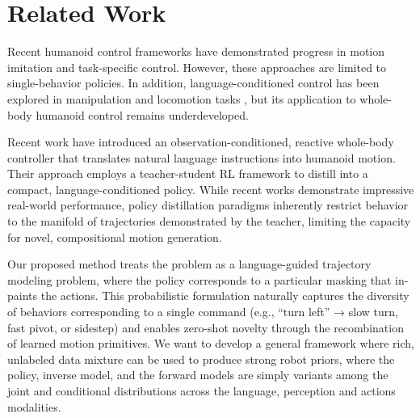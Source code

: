 \section{Related Work}
\label{sec:related-work}

Recent humanoid control frameworks \cite{liao2025beyondmimicmotiontrackingversatile} \cite{ji2024exbody2} have demonstrated progress in motion imitation and task-specific control. However, these approaches are limited to single-behavior policies. In addition, language-conditioned control has been explored in manipulation and locomotion tasks \cite{DBLP:journals/corr/abs-2109-01115}, but its application to whole-body humanoid control remains underdeveloped.

Recent work \cite{shao2025langwbclanguagedirectedhumanoidwholebody} have introduced an observation-conditioned, reactive whole-body controller that translates natural language instructions into humanoid motion. Their approach employs a teacher-student RL framework to distill into a compact, language-conditioned policy. While recent works demonstrate impressive real-world performance, policy distillation paradigms inherently restrict behavior to the manifold of trajectories demonstrated by the teacher, limiting the capacity for novel, compositional motion generation.

Our proposed method treats the problem as a language-guided trajectory modeling problem, where the policy corresponds to a particular masking that in-paints the actions. This probabilistic formulation naturally captures the diversity of behaviors corresponding to a single command (e.g., “turn left” → slow turn, fast pivot, or sidestep) and enables zero-shot novelty through the recombination of learned motion primitives. We want to develop a general framework where rich, unlabeled data mixture can be used to produce strong robot priors, where the policy, inverse model, and the forward models are simply variants among the joint and conditional distributions across the language, perception and actions modalities.